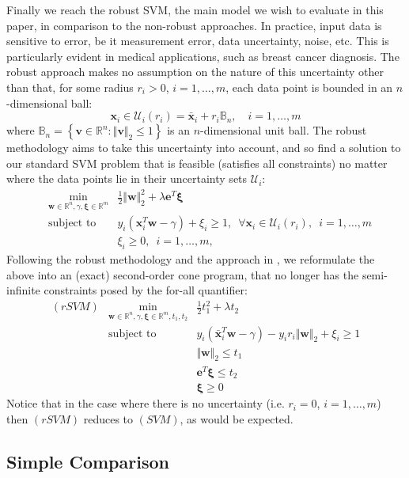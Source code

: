 \documentclass[11pt]{article}
\newcommand{\ds}{\displaystyle}
\begin{document}
Finally we reach the robust SVM, the main model we wish to evaluate in this paper, in comparison to the non-robust approaches. In practice, input data is sensitive to error, be it measurement error, data uncertainty, noise, etc. This is particularly evident in medical applications, such as breast cancer diagnosis. The robust approach makes no assumption on the nature of this uncertainty other than that, for some radius $r_i>0$, $i=1,\dots,m$, each data point is bounded in an $n$-dimensional ball:
\[
\bm{x}_i\in\mathcal{U}_i(r_i) = \bar{\bm{x}}_i + r_i\mathbb{B}_n, \quad i=1,\dots,m
\]
where $\mathbb{B}_n = \left\{\bm{v}\in\mathbb{R}^n : \Vert \bm{v}\Vert_2\leq 1\right\}$ is an $n$-dimensional unit ball. The robust methodology aims to take this uncertainty into account, and so find a solution to our standard SVM problem that is feasible (satisfies all constraints) no matter where the data points lie in their uncertainty sets $\mathcal{U}_i$:
\begin{eqnarray*}
& \ds\min_{\bm{w}\in\mathbb{R}^n, \gamma, \bm{\xi}\in\mathbb{R}^m} & \frac{1}{2}\Vert \bm{w} \Vert_2^2 + \lambda\bm{e}^T\bm{\xi}
\\
& \mbox{subject to } & y_i(\bm{x}_i^T\bm{w} - \gamma) + \xi_i \geq 1, \enspace \forall \bm{x}_i\in\mathcal{U}_i(r_i),\enspace i=1,\dots,m
\\
& & \xi_i \geq 0, \enspace i=1,\dots,m, 
\end{eqnarray*}
Following the robust methodology and the approach in \cite{rsvm}, we reformulate the above into an (exact) second-order cone program, that no longer has the semi-infinite constraints posed by the for-all quantifier:
\begin{eqnarray*}
(rSVM) & \ds\min_{\bm{w}\in\mathbb{R}^n, \gamma, \bm{\xi}\in\mathbb{R}^m, t_1, t_2} & \frac{1}{2}t_1^2 + \lambda t_2
\\
& \mbox{subject to } & y_i\left(\bar{\bm{x}}_i^T\bm{w}-\gamma\right) - y_ir_i\Vert\bm{w}\Vert_2 + \xi_i \geq 1
\\
& & \Vert \bm{w} \Vert_2 \leq t_1
\\
& & \bm{e}^T\bm{\xi} \leq t_2
\\
& & \bm{\xi}\geq 0
\end{eqnarray*}
Notice that in the case where there is no uncertainty (i.e. $r_i=0$, $i=1,\dots,m$) then $(rSVM)$ reduces to $(SVM)$, as would be expected.

\subsection*{Simple Comparison}
\end{document}
